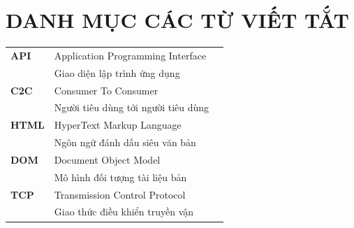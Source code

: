 \documentclass{article}
\renewcommand{\tablename}{\fontsize{12pt}{0pt}\selectfont \bfseries Bảng}
\begin{document}
{%
\let\oldnumberline\numberline%
\renewcommand{\numberline}{\tablename~\oldnumberline}%
\listoftables%
}
\cleardoublepage

\section*{DANH MỤC CÁC TỪ VIẾT TẮT}
\begin{table}[H]
    \centering
    \begin{tabular}{p{} l p{}}
        \fontsize{13pt}{0pt}\selectfont \bfseries API&\fontsize{13pt}{0pt}\selectfont Application Programming Interface
        \vspace{6pt}\\
        &\fontsize{13pt}{0pt}\selectfont Giao diện lập trình ứng dụng\vspace{8pt}\\
        \fontsize{13pt}{0pt}\selectfont \bfseries C2C&\fontsize{13pt}{0pt}\selectfont Consumer To Consumer
        \vspace{6pt}\\
        &\fontsize{13pt}{0pt}\selectfont Người tiêu dùng tới người tiêu dùng\vspace{8pt}\\
        \fontsize{13pt}{0pt}\selectfont \bfseries HTML&\fontsize{13pt}{0pt}\selectfont HyperText Markup Language
        \vspace{6pt}\\
        &\fontsize{13pt}{0pt}\selectfont Ngôn ngữ đánh dấu siêu văn bản\vspace{8pt}\\
        \fontsize{13pt}{0pt}\selectfont \bfseries DOM&\fontsize{13pt}{0pt}\selectfont Document Object Model
        \vspace{6pt}\\
        &\fontsize{13pt}{0pt}\selectfont Mô hình đối tượng tài liệu bản\vspace{8pt}\\
        \fontsize{13pt}{0pt}\selectfont \bfseries TCP&\fontsize{13pt}{0pt}\selectfont Transmission Control Protocol
        \vspace{6pt}\\
        &\fontsize{13pt}{0pt}\selectfont Giao thức điều khiển truyền vận\vspace{8pt}\\

\end{tabular}
\end{table}
\end{document}
